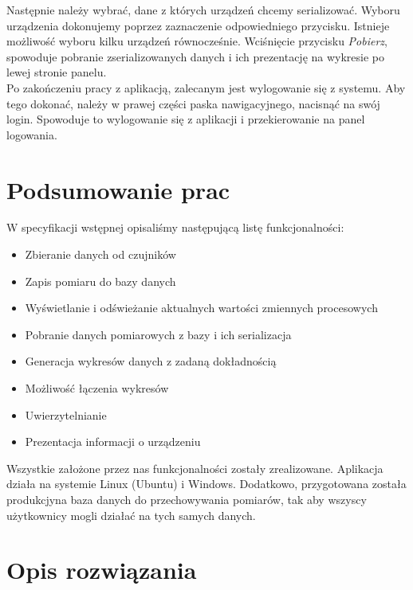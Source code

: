 \documentclass{article}
\begin{document}
Następnie należy wybrać, dane z których urządzeń chcemy serializować. Wyboru urządzenia dokonujemy 
poprzez zaznaczenie odpowiedniego przycisku. Istnieje możliwość wyboru kilku urządzeń równocześnie.
Wciśnięcie przycisku \textit{Pobierz}, spowoduje pobranie zserializowanych danych i ich 
prezentację na wykresie po lewej stronie panelu. \\

Po zakończeniu pracy z aplikacją, zalecanym jest wylogowanie się z systemu. Aby tego dokonać,
należy w prawej części paska nawigacyjnego, nacisnąć na swój login. Spowoduje to wylogowanie się 
z aplikacji i przekierowanie na panel logowania.

\section{Podsumowanie prac}
W specyfikacji wstępnej opisaliśmy następującą listę funkcjonalności:
\begin{itemize}
    \item Zbieranie danych od czujników
    \item Zapis pomiaru do bazy danych
    \item Wyświetlanie i odświeżanie aktualnych wartości zmiennych procesowych
    \item Pobranie danych pomiarowych z bazy i ich serializacja
    \item Generacja wykresów danych z zadaną dokładnością
    \item Możliwość łączenia wykresów
    \item Uwierzytelnianie
    \item Prezentacja informacji o urządzeniu
\end{itemize}

Wszystkie założone przez nas funkcjonalności zostały zrealizowane. Aplikacja działa
na systemie Linux (Ubuntu) i Windows. Dodatkowo, przygotowana została produkcjyna 
baza danych do przechowywania pomiarów, tak aby wszyscy użytkownicy mogli działać na tych 
samych danych.

\section{Opis rozwiązania}
\end{document}
